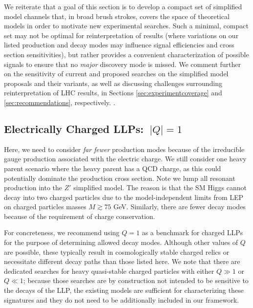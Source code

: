     We reiterate that a goal of this section is to develop a compact set of simplified model channels that, in broad brush strokes, covers the space of theoretical models in order to motivate new experimental searches. Such a minimal, compact set may not be optimal for reinterpretation of results (where variations on our listed production and decay modes may influence signal efficiencies and cross section sensitivities), but rather provides a convenient characterization of possible signals to ensure that no \emph{major} discovery mode is missed. We comment further on the sensitivity of current and proposed searches on the simplified model proposals and their variants, as well as discussing challenges surrounding reinterpretation of LHC results, in Sections \ref{sec:experimentcoverage} and \ref{sec:recommendations}, respectively. .

\subsection{Electrically Charged LLPs:~$|Q|=1$}

Here, we need to consider \emph{far fewer} production modes because of the irreducible gauge production associated with the electric charge. We still consider one heavy parent scenario where the heavy parent has a QCD charge, as this could potentially dominate the production cross section. Note we lump all resonant production into the $Z'$ simplified model.  The reason is that the SM Higgs cannot decay into two charged particles due to the model-independent limits from LEP on charged particles masses $M\gtrsim75$ GeV.   Similarly, there are fewer decay modes because of the requirement of charge conservation.  %

For concreteness, we recommend using $Q=1$ as a benchmark for charged LLPs for the purpose of determining allowed decay modes. 
Although other values of $Q$ are possible, these typically result in cosmologically stable charged relics or necessitate different decay paths than those listed here.   
We note that there are dedicated searches for heavy quasi-stable charged particles with either $Q\gg1$ or $Q\ll1$; because those searches are by construction not intended to be sensitive to the decays of the LLP, the existing models are sufficient for characterizing these signatures and they do not need to be additionally included in our framework.

